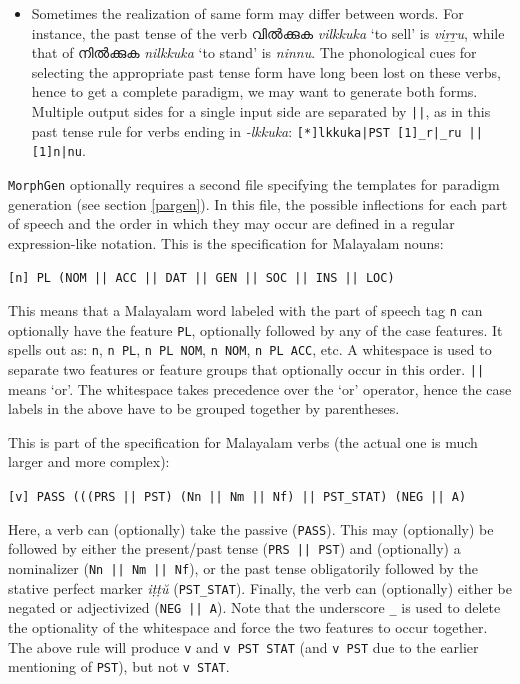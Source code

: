 \documentclass[a4paper]{article}
\newcommand{\typ}[1]{\texttt{#1}}
\begin{document}
\begin{itemize}
\item Sometimes the realization of same form may differ between words. For instance, the past tense of the verb വിൽക്കുക \textit{vilkkuka} `to sell' is \textit{viṟṟu}, while that of നിൽക്കുക \textit{nilkkuka} `to stand' is \textit{ninnu}. The phonological cues for selecting the appropriate past tense form have long been lost on these verbs, hence to get a complete paradigm, we may want to generate both forms. Multiple output sides for a single input side are separated by \typ{||}, as in this past tense rule for verbs ending in \textit{-lkkuka}: \typ{[*]lkkuka|PST	[1]\_r|\_ru || [1]n|nu}.
\end{itemize}

\typ{MorphGen} optionally requires a second file specifying the templates for paradigm generation (see section \ref{pargen}). In this file, the possible inflections for each part of speech and the order in which they may occur are defined in a regular expression-like notation. This is the specification for Malayalam nouns:

\typ{[n] PL (NOM || ACC || DAT || GEN || SOC || INS || LOC)}

This means that a Malayalam word labeled with the part of speech tag \typ{n} can optionally have the feature \typ{PL}, optionally followed by any of the case features. It spells out as: \typ{n}, \typ{n PL}, \typ{n PL NOM}, \typ{n NOM}, \typ{n PL ACC}, etc. A whitespace is used to separate two features or feature groups that optionally occur in this order. \typ{||} means `or'. The whitespace takes precedence over the `or' operator, hence the case labels in the above have to be grouped together by parentheses.

This is part of the specification for Malayalam verbs (the actual one is much larger and more complex):

\typ{[v] PASS (((PRS || PST) (Nn || Nm || Nf) || PST\_STAT) (NEG || A)}

Here, a verb can (optionally) take the passive (\typ{PASS}). This may (optionally) be followed by either the present/past tense (\typ{PRS || PST}) and (optionally) a nominalizer (\typ{Nn || Nm || Nf}), or the past tense obligatorily followed by the stative perfect marker \textit{iṭṭŭ} (\typ{PST\_STAT}). Finally, the verb can (optionally) either be negated or adjectivized (\typ{NEG || A}). Note that the underscore \typ{\_} is used to delete the optionality of the whitespace and force the two features to occur together. The above rule will produce \typ{v} and \typ{v PST STAT} (and \typ{v PST} due to the earlier mentioning of \typ{PST}), but not \typ{v STAT}.
\end{document}
